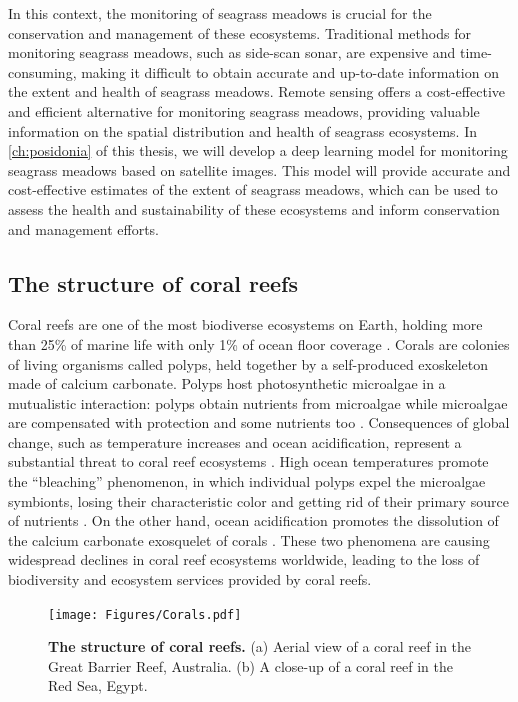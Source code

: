 In this context, the monitoring of seagrass meadows is crucial for the
conservation and management of these ecosystems. Traditional methods for
monitoring seagrass meadows, such as side-scan sonar, are expensive and
time-consuming, making it difficult to obtain accurate and up-to-date
information on the extent and health of seagrass meadows. Remote
sensing offers a cost-effective and efficient alternative for monitoring
seagrass meadows, providing valuable information on the spatial distribution
and health of seagrass ecosystems. In \cref{ch:posidonia} of this thesis, we
will develop a deep learning model for monitoring seagrass meadows based on
satellite images. This model will provide accurate and cost-effective
estimates
of the extent of seagrass meadows, which can be used to assess the health and
sustainability of these ecosystems and inform conservation and management
efforts.

\subsection{\label{sec:The structure of coral reefs} The structure of coral
  reefs}

Coral reefs are one of the most biodiverse ecosystems on Earth, holding more
than 25\% of marine life with only 1\% of ocean floor coverage
\cite{reaka1997global}. Corals are colonies of living organisms called polyps,
held together by a self-produced exoskeleton made of calcium carbonate.
Polyps
host photosynthetic microalgae in a mutualistic interaction: polyps obtain
nutrients from microalgae while microalgae are compensated with protection
and
some nutrients too \cite{Muller-Parker2015}. Consequences of global change,
such as temperature increases and ocean acidification, represent a
substantial
threat to coral reef ecosystems \cite{Couce2013}. High ocean temperatures
promote the ``bleaching'' phenomenon, in which individual polyps expel the
microalgae symbionts, losing their characteristic color and getting rid of
their primary source of nutrients \cite{Brown1997}. On the other hand, ocean
acidification promotes the dissolution of the calcium carbonate exosquelet of
corals \cite{Guldberg2007}. These two phenomena are causing widespread
declines
in coral reef ecosystems worldwide, leading to the loss of biodiversity and
ecosystem services provided by coral reefs.

\begin{figure}[H]
  \centering
  \texttt{[image: Figures/Corals.pdf]}
  \caption[The structure of a coral reef]{
    \textbf{The structure of coral reefs.} (a) Aerial view of a coral reef in
    the Great Barrier Reef, Australia. (b) A close-up of a coral reef in the
    Red Sea, Egypt.}
  \label{fig:Coral_reef}
\end{figure}

